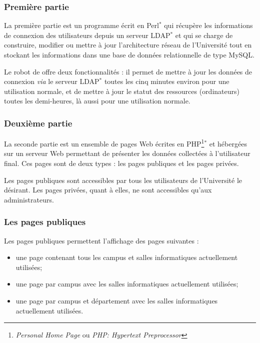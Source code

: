 \subsubsection{Premi\`ere partie}

La premi\`ere partie est un programme \'ecrit en Perl$^*$ qui r\'ecup\`ere les informations de connexion des utilisateurs depuis un serveur LDAP$^*$ et qui se charge de construire, modifier ou mettre \`a jour l'architecture r\'eseau de l'Universit\'e tout en stockant les informations dans une base de donn\'ees relationnelle de type MySQL.

Le robot de \Yuukou{} offre deux fonctionnalit\'es : il permet de mettre \`a jour les donn\'ees de connexion \textit{via} le serveur LDAP$^*$ toutes les cinq minutes environ pour une utilisation normale, et de mettre \`a jour le statut des ressources (ordinateurs) toutes les demi-heures, l\`a aussi pour une utilisation normale.

\subsubsection{Deuxi\`eme partie}

La seconde partie est un ensemble de pages Web \'ecrites en PHP\protect\footnote{\textit{Personal Home Page} ou \textit{PHP: Hypertext Preprocessor}}$^*$ et h\'eberg\'ees sur un serveur Web permettant de pr\'esenter les donn\'ees collect\'ees \`a l'utilisateur final.
Ces pages sont de deux types : les pages publiques et les pages priv\'ees.

Les pages publiques sont accessibles par tous les utilisateurs de l'Universit\'e le d\'esirant.
Les pages priv\'ees, quant \`a elles, ne sont accessibles qu'aux administrateurs.

\subsubsection{Les pages publiques}

\noindent Les pages publiques permettent l'affichage des pages suivantes :

\begin{itemize}
	\item une page contenant tous les campus et salles informatiques actuellement utilis\'ees;
	\item une page par campus avec les salles informatiques actuellement utilis\'ees;
	\item une page par campus et d\'epartement avec les salles informatiques actuellement utilis\'ees.

\end{itemize}

